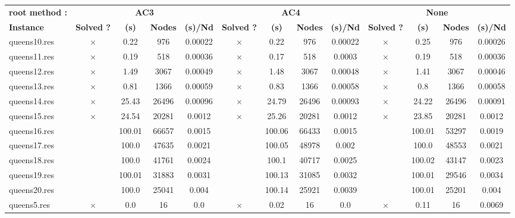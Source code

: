 \documentclass[main.tex]{subfiles}
\begin{document}
\thispagestyle{empty}

\begin{landscape}
\begin{center}
\renewcommand{\arraystretch}{1.4} 
\begin{tabular}{|l|cccc|cccc|cccc|}
	\hline
\textbf{root method :} & \multicolumn{4}{c}{\textbf{AC3}} & \multicolumn{4}{c}{\textbf{AC4}} & \multicolumn{4}{c}{\textbf{None}}\\
\textbf{Instance}  & \textbf{Solved ?} & \textbf{(s)} & \textbf{Nodes} & \textbf{(s)/Nd} & \textbf{Solved ?} & \textbf{(s)} & \textbf{Nodes} & \textbf{(s)/Nd} & \textbf{Solved ?} & \textbf{(s)} & \textbf{Nodes} & \textbf{(s)/Nd}\\\hline

queens10.res & $\times$ & 0.22 & 976 & 0.00022
 & $\times$ & 0.22 & 976 & 0.00022
 & $\times$ & 0.25 & 976 & 0.00026
\\
queens11.res & $\times$ & 0.19 & 518 & 0.00036
 & $\times$ & 0.17 & 518 & 0.0003
 & $\times$ & 0.19 & 518 & 0.00036
\\
queens12.res & $\times$ & 1.49 & 3067 & 0.00049
 & $\times$ & 1.48 & 3067 & 0.00048
 & $\times$ & 1.41 & 3067 & 0.00046
\\
queens13.res & $\times$ & 0.81 & 1366 & 0.00059
 & $\times$ & 0.83 & 1366 & 0.00058
 & $\times$ & 0.8 & 1366 & 0.00058
\\
queens14.res & $\times$ & 25.43 & 26496 & 0.00096
 & $\times$ & 24.79 & 26496 & 0.00093
 & $\times$ & 24.22 & 26496 & 0.00091
\\
queens15.res & $\times$ & 24.54 & 20281 & 0.0012
 & $\times$ & 25.26 & 20281 & 0.0012
 & $\times$ & 23.85 & 20281 & 0.0012
\\
queens16.res &  & 100.01 & 66657 & 0.0015
 &  & 100.06 & 66433 & 0.0015
 &  & 100.01 & 53297 & 0.0019
\\
queens17.res &  & 100.0 & 47635 & 0.0021
 &  & 100.05 & 48978 & 0.002
 &  & 100.0 & 48553 & 0.0021
\\
queens18.res &  & 100.0 & 41761 & 0.0024
 &  & 100.1 & 40717 & 0.0025
 &  & 100.02 & 43147 & 0.0023
\\
queens19.res &  & 100.01 & 31883 & 0.0031
 &  & 100.13 & 31085 & 0.0032
 &  & 100.01 & 29546 & 0.0034
\\
queens20.res &  & 100.0 & 25041 & 0.004
 &  & 100.14 & 25921 & 0.0039
 &  & 100.01 & 25201 & 0.004
\\
queens5.res & $\times$ & 0.0 & 16 & 0.0
 & $\times$ & 0.02 & 16 & 0.0
 & $\times$ & 0.11 & 16 & 0.0069
\\

\end{tabular}
\end{center}
\end{landscape}
\end{document}
